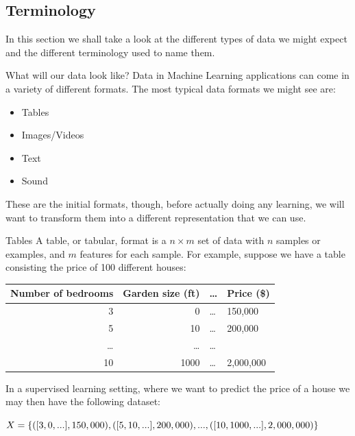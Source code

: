 \documentclass[10pt]{beamer}
\begin{document}
\subsection*{Terminology}
\label{sec:org6592988}

In this section we shall take a look at the different types of data we might expect
and the different terminology used to name them.

\begin{frame}[label={sec:orgb557fd4}]{What will our data look like?}
Data in Machine Learning applications can come in a variety of different formats. The
most typical data formats we might see are:

\begin{itemize}
\item Tables
\item Images/Videos
\item Text
\item Sound
\end{itemize}

These are the initial formats, though, before actually doing any learning, we will
want to transform them into a different representation that we can use.
\end{frame}

\begin{frame}[label={sec:org8701876}]{Tables}
A table, or tabular, format is a \(n \times m\) set of data with \(n\) samples or
examples, and \(m\) features for each sample. For example, suppose we have a table
consisting the price of 100 different houses:

\begin{center}
\begin{tabular}{rrll}
\toprule
Number of bedrooms & Garden size (ft) & \ldots{} & Price (\$)\\
\midrule
3 & 0 & \ldots{} & 150,000\\
5 & 10 & \ldots{} & 200,000\\
\ldots{} & \ldots{} & \ldots{} & \\
10 & 1000 & \ldots{} & 2,000,000\\
\bottomrule
\end{tabular}
\end{center}

In a supervised learning setting, where we want to predict the price of a house we may then have the following dataset:

\(X = \{([3, 0, ...], 150,000), ([5, 10, ...], 200,000), \\..., ([10, 1000, ...], 2,000,000)\}\)
\end{frame}
\end{document}
